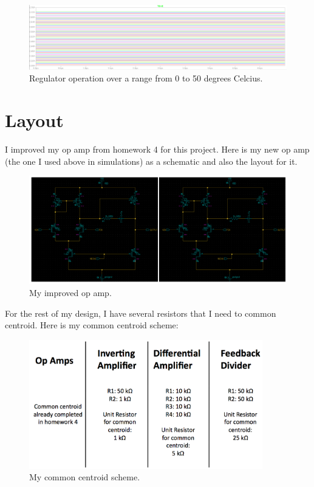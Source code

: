 \documentclass[10pt]{amsart}
\begin{document}
\begin{figure}[h]
	\begin{center}
		\includegraphics[width=7in]{Media/thermsw.png}
	\end{center}
	\caption{Regulator operation over a range from 0 to 50 degrees Celcius.}
	\label{fig:neg}
\end{figure}

\section{Layout}

I improved my op amp from homework 4 for this project. Here is my new op amp (the one I used above in simulations) as a schematic and also the layout for it.

\begin{figure}[h]
	\begin{center}
		\includegraphics[width=7in]{Media/opamp.png}
	\end{center}
	\caption{My improved op amp.}
	\label{fig:neg}
\end{figure}

\newpage

For the rest of my design, I have several resistors that I need to common centroid. Here is my common centroid scheme:

\begin{figure}[h]
	\begin{center}
		\includegraphics[width=4in]{Media/ccplan.png}
	\end{center}
	\caption{My common centroid scheme.}
	\label{fig:cc}
\end{figure}
\end{document}
